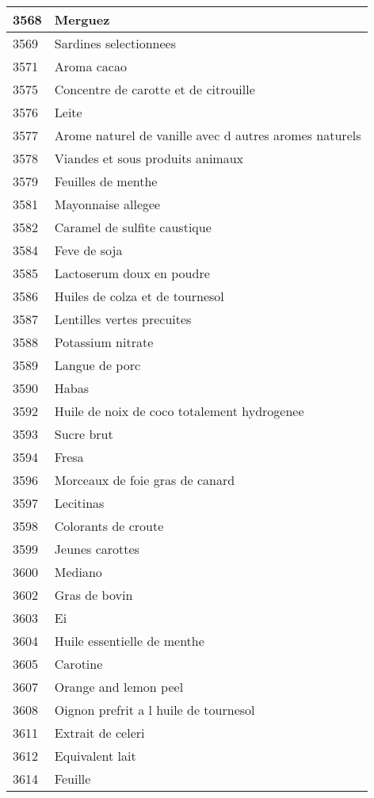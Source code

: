 \begin{longtable}{|l|l|}
3568 & Merguez \\ \hline 
3569 & Sardines selectionnees \\ \hline 
3571 & Aroma cacao \\ \hline 
3575 & Concentre de carotte et de citrouille \\ \hline 
3576 & Leite \\ \hline 
3577 & Arome naturel de vanille avec d autres aromes naturels \\ \hline 
3578 & Viandes et sous produits animaux \\ \hline 
3579 & Feuilles de menthe \\ \hline 
3581 & Mayonnaise allegee \\ \hline 
3582 & Caramel de sulfite caustique \\ \hline 
3584 & Feve de soja \\ \hline 
3585 & Lactoserum doux en poudre \\ \hline 
3586 & Huiles de colza et de tournesol \\ \hline 
3587 & Lentilles vertes precuites \\ \hline 
3588 & Potassium nitrate \\ \hline 
3589 & Langue de porc \\ \hline 
3590 & Habas \\ \hline 
3592 & Huile de noix de coco totalement hydrogenee \\ \hline 
3593 & Sucre brut \\ \hline 
3594 & Fresa \\ \hline 
3596 & Morceaux de foie gras de canard \\ \hline 
3597 & Lecitinas \\ \hline 
3598 & Colorants de croute \\ \hline 
3599 & Jeunes carottes \\ \hline 
3600 & Mediano \\ \hline 
3602 & Gras de bovin \\ \hline 
3603 & Ei \\ \hline 
3604 & Huile essentielle de menthe \\ \hline 
3605 & Carotine \\ \hline 
3607 & Orange and lemon peel \\ \hline 
3608 & Oignon prefrit a l huile de tournesol \\ \hline 
3611 & Extrait de celeri \\ \hline 
3612 & Equivalent lait \\ \hline 
3614 & Feuille \\ \hline 

\end{longtable}
